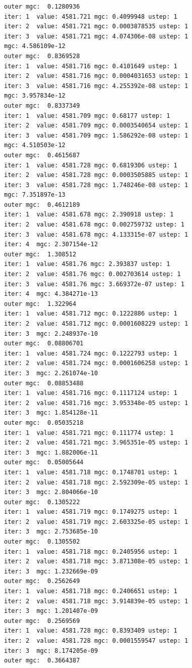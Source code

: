 \documentclass[
  letterpaper,
  DIV=11,
  numbers=noendperiod]{scrartcl}
\begin{document}
\begin{verbatim}
outer mgc:  0.1280936 
iter: 1  value: 4581.721 mgc: 0.4099948 ustep: 1 
iter: 2  value: 4581.721 mgc: 0.0003878535 ustep: 1 
iter: 3  value: 4581.721 mgc: 4.074306e-08 ustep: 1 
mgc: 4.586109e-12 
outer mgc:  0.8369528 
iter: 1  value: 4581.716 mgc: 0.4101649 ustep: 1 
iter: 2  value: 4581.716 mgc: 0.0004031653 ustep: 1 
iter: 3  value: 4581.716 mgc: 4.255392e-08 ustep: 1 
mgc: 3.957834e-12 
outer mgc:  0.8337349 
iter: 1  value: 4581.709 mgc: 0.68177 ustep: 1 
iter: 2  value: 4581.709 mgc: 0.0003540654 ustep: 1 
iter: 3  value: 4581.709 mgc: 1.586292e-08 ustep: 1 
mgc: 4.510503e-12 
outer mgc:  0.4615687 
iter: 1  value: 4581.728 mgc: 0.6819306 ustep: 1 
iter: 2  value: 4581.728 mgc: 0.0003505885 ustep: 1 
iter: 3  value: 4581.728 mgc: 1.748246e-08 ustep: 1 
mgc: 7.351897e-13 
outer mgc:  0.4612189 
iter: 1  value: 4581.678 mgc: 2.390918 ustep: 1 
iter: 2  value: 4581.678 mgc: 0.002759732 ustep: 1 
iter: 3  value: 4581.678 mgc: 4.133315e-07 ustep: 1 
iter: 4  mgc: 2.307154e-12 
outer mgc:  1.308512 
iter: 1  value: 4581.76 mgc: 2.393837 ustep: 1 
iter: 2  value: 4581.76 mgc: 0.002703614 ustep: 1 
iter: 3  value: 4581.76 mgc: 3.669372e-07 ustep: 1 
iter: 4  mgc: 4.384271e-13 
outer mgc:  1.322964 
iter: 1  value: 4581.712 mgc: 0.1222886 ustep: 1 
iter: 2  value: 4581.712 mgc: 0.0001608229 ustep: 1 
iter: 3  mgc: 2.248937e-10 
outer mgc:  0.08806701 
iter: 1  value: 4581.724 mgc: 0.1222793 ustep: 1 
iter: 2  value: 4581.724 mgc: 0.0001606258 ustep: 1 
iter: 3  mgc: 2.261074e-10 
outer mgc:  0.08853488 
iter: 1  value: 4581.716 mgc: 0.1117124 ustep: 1 
iter: 2  value: 4581.716 mgc: 3.953348e-05 ustep: 1 
iter: 3  mgc: 1.854128e-11 
outer mgc:  0.05035218 
iter: 1  value: 4581.721 mgc: 0.111774 ustep: 1 
iter: 2  value: 4581.721 mgc: 3.965351e-05 ustep: 1 
iter: 3  mgc: 1.882006e-11 
outer mgc:  0.05005644 
iter: 1  value: 4581.718 mgc: 0.1748701 ustep: 1 
iter: 2  value: 4581.718 mgc: 2.592309e-05 ustep: 1 
iter: 3  mgc: 2.804066e-10 
outer mgc:  0.1305222 
iter: 1  value: 4581.719 mgc: 0.1749275 ustep: 1 
iter: 2  value: 4581.719 mgc: 2.603325e-05 ustep: 1 
iter: 3  mgc: 2.753685e-10 
outer mgc:  0.1305502 
iter: 1  value: 4581.718 mgc: 0.2405956 ustep: 1 
iter: 2  value: 4581.718 mgc: 3.871308e-05 ustep: 1 
iter: 3  mgc: 1.232669e-09 
outer mgc:  0.2562649 
iter: 1  value: 4581.718 mgc: 0.2406651 ustep: 1 
iter: 2  value: 4581.718 mgc: 3.914839e-05 ustep: 1 
iter: 3  mgc: 1.201407e-09 
outer mgc:  0.2569569 
iter: 1  value: 4581.728 mgc: 0.8393409 ustep: 1 
iter: 2  value: 4581.728 mgc: 0.0001559547 ustep: 1 
iter: 3  mgc: 8.174205e-09 
outer mgc:  0.3664387 

\end{verbatim}
\end{document}
